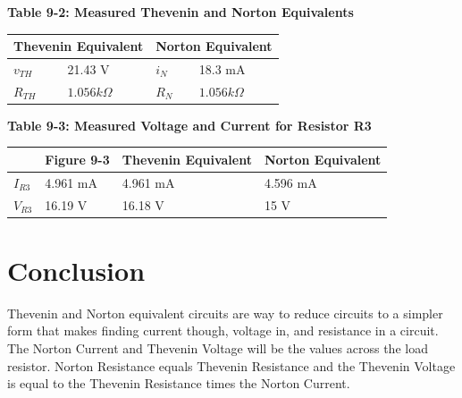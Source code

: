 \documentclass[a4paper]{article}
\begin{document}
\begin{center}
    \small\textbf{Table 9-2: Measured Thevenin and Norton Equivalents \cite{UNCC-ECE-Dept:2023}}
    \begin{tabular}{|p{3 cm}|p{3cm}|p{3 cm}|p{3 cm}|}      
        \hline
        \multicolumn{2}{|c|}{Thevenin Equivalent} & \multicolumn{2}{|c|}{Norton Equivalent}  \\
        \hline
        $v_{TH}$ & 21.43 V & $i_{N}$ & 18.3 mA \\
        \hline
        $R_{TH}$ & $1.056k\Omega$ & $R_{N}$ & $1.056k\Omega$ \\
        \hline
    \end{tabular}
\end{center}

\begin{center}
    \small\textbf{Table 9-3: Measured Voltage and Current for Resistor R3 \cite{UNCC-ECE-Dept:2023}}
    \begin{tabular}{|p{3 cm}|p{3 cm}|p{3 cm}|p{3 cm}|}
        \hline
        & Figure 9-3 & Thevenin Equivalent & Norton Equivalent \\
        \hline
        $I_{R3}$ & 4.961 mA & 4.961 mA & 4.596 mA \\
        \hline
        $V_{R3}$ & 16.19 V & 16.18 V & 15 V\\
        \hline
    \end{tabular}
\end{center}



\section{Conclusion}

Thevenin and Norton equivalent circuits are way to reduce circuits to a simpler form that makes finding current though, voltage in, and resistance in a circuit. The Norton Current and Thevenin Voltage
will be the values across the load resistor. Norton Resistance equals Thevenin Resistance and the Thevenin Voltage is equal to the Thevenin Resistance times the Norton Current.  



\end{document}
